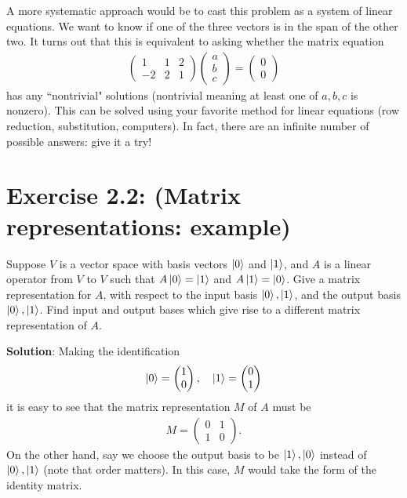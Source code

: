 \documentclass{book}
\begin{document}
    A more systematic approach would be to cast this problem as a system of linear equations. We want to know if one of the three vectors is in the span of the other two. It turns out that this is equivalent to asking whether the matrix equation
    \begin{align}
    \begin{pmatrix}
        1 & 1 & 2 \\
        -2 & 2 & 1
    \end{pmatrix}
    \begin{pmatrix}
        a \\
        b \\
        c
    \end{pmatrix}
    =\begin{pmatrix}
        0 \\ 
        0
    \end{pmatrix}
    \end{align}
    has any ``nontrivial" solutions (nontrivial meaning at least one of $a, b, c$ is nonzero). This can be solved using your favorite method for linear equations (row reduction, substitution, computers). In fact, there are an infinite number of possible answers: give it a try!

\section*{Exercise 2.2: (Matrix representations: example)}
    Suppose $V$ is a vector space with basis vectors $\ket{0}$ and $\ket{1}$, and $A$ is a linear operator from $V$ to $V$ such that $A\ket{0}=\ket{1}$ and $A\ket{1}=\ket{0}$. Give a matrix representation for $A$, with respect to the input basis $\ket{0}, \ket{1}$, and the output basis $\ket{0}, \ket{1}$. Find input and output bases which give rise to a different matrix representation of $A$.
    
    \textbf{Solution}: Making the identification
    \begin{align}
    \ket{0} =
    \begin{pmatrix}
        1 \\
        0
    \end{pmatrix}, \quad
    \ket{1} =
    \begin{pmatrix}
        0 \\
        1
    \end{pmatrix}
    \end{align}
    it is easy to see that the matrix representation $M$ of $A$ must be 
    \begin{align}
        M = 
        \begin{pmatrix}
            0 & 1 \\
            1 & 0
        \end{pmatrix}.
    \end{align}
    On the other hand, say we choose the output basis to be $\ket{1},\ket{0}$ instead of $\ket{0},\ket{1}$ (note that order matters). In this case, $M$ would take the form of the identity matrix.
\end{document}
